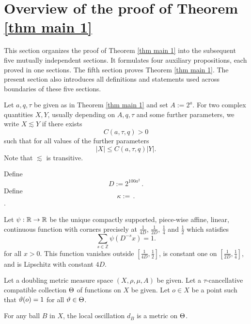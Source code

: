 \chapter{Overview of the proof of Theorem \ref{thm main 1}}
\label{overviewsection}


This section organizes the proof of Theorem
\ref{thm main 1} into the subsequent five
mutually independent sections.
It formulates four auxiliary propositions, each proved
    in one sections. The fifth section proves Theorem \ref{thm main 1}.
The present section  also introduces all definitions and statements used across boundaries of these five sections.


Let $a, q, \tau$ be given as in Theorem \ref{thm main 1}
and set $A:=2^a$.
For two complex quantities $X,Y$, usually depending on
$A, q, \tau$ and some further parameters,
we write $X\lesssim Y$ if there exists
    \[C(a,\tau,q)>0\]
such that for all values of the further parameters
\[|X|\le C(a,\tau,q)|Y|.\] Note that $\lesssim$ is transitive.



Define
\begin{equation}\label{defineD}
D:= 2^{100 a^2}\,  .
\end{equation}
Define
\begin{equation}\label{definekappa}
\kappa:= \,  .
\end{equation}
.

Let
    $\psi:\mathbb{R} \to \mathbb{R}$ be the unique compactly supported, piece-wise affine, linear, continuous function with corners precisely at $\frac 1{4D}$, $\frac 1{2D}$, $\frac 14$ and $\frac 12$ which satisfies
    \begin{equation}
    \label{eq psisum}
    \sum_{s\in \mathbb{Z}} \psi(D^{-s}x)=1 .
\end{equation}
for all  $x>0$. This function vanishes outside $[\frac1{4D},\frac 12]$, is constant one on
$[\frac1{2D},\frac 14]$, and is Lipschitz
with constant $4D$.







Let a doubling metric measure space $(X,\rho,\mu, A)$ be given.
Let a $\tau$-cancellative compatible collection $\Theta$ of functions on $X$ be given. 
Let $o\in X$ be a point such that $\vartheta(o)=1$
for all $\vartheta\in \Theta$.

\begin{lemma}
    For any ball $B$ in $X$, the local oscillation
$d_{B}$ is a metric on $\Theta$.
\end{lemma}

